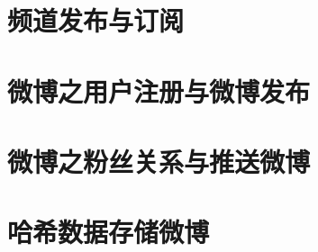 \documentclass[UTF8,a4paper,12pt]{ctexbook}
\begin{document}
	\section{频道发布与订阅}
	
	\section{微博之用户注册与微博发布}
	
	\section{微博之粉丝关系与推送微博}
	
	\section{哈希数据存储微博}
		    
\end{document}
